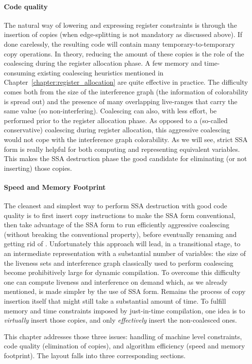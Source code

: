 \paragraph{Code quality}
The natural way of lowering \phifuns and expressing register constraints is through the insertion of copies (when edge-splitting is not mandatory as discussed above). If done carelessly, the resulting code will contain many temporary-to-temporary copy operations. In theory, reducing the amount of these copies is the role of the coalescing during the register allocation phase.
A few memory and time-consuming existing coalescing heuristics mentioned in Chapter~\ref{chapter:register_allocation} are quite effective in practice. The difficulty comes both from the size of the interference graph (the information of colorability is spread out) and the presence of many overlapping live-ranges that carry the same value (so non-interfering).
Coalescing can also, with less effort, be performed prior to the register allocation phase. As opposed to a (so-called conservative) coalescing during register allocation, this aggressive coalescing would not cope with the interference graph colorability. As we will see, strict SSA form is really helpful for both computing and representing equivalent variables. This makes the SSA destruction phase the good candidate for eliminating (or not inserting) those copies.

\paragraph{Speed and Memory Footprint}
The cleanest and simplest way to perform SSA destruction with good code quality is to first insert copy instructions to make the SSA form conventional, then take advantage of the SSA form to run efficiently aggressive coalescing (without breaking the conventional property), before eventually renaming \phiwebs\index{\phiweb} and getting rid of \phifuns.
Unfortunately this approach will lead, in a transitional stage, to an intermediate representation with a substantial number of variables: the size of the liveness sets and interference graph classically used to perform coalescing become prohibitively large for dynamic compilation.
To overcome this difficulty one can compute liveness and interference on demand which, as we already mentioned, is made simpler by the use of SSA form.
Remains the process of copy insertion itself that might still take a substantial amount of time.
To fulfill memory and time constraints imposed by just-in-time compilation, one idea is to \emph{virtually} insert those copies, and only \emph{effectively} insert the non-coalesced ones.

This chapter addresses those three issues: handling of machine level constraints, code quality (elimination of copies), and algorithm efficiency (speed and memory footprint). The layout falls into three corresponding sections.

